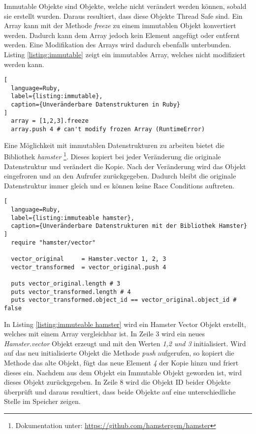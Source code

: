 Immutable Objekte sind Objekte, welche nicht verändert werden können, sobald sie erstellt wurden. Daraus resultiert, dass diese Objekte Thread Safe sind. Ein Array kann mit der Methode \emph{freeze} zu einem immutablen Objekt konvertiert werden. Dadurch kann dem Array jedoch kein Element angefügt oder entfernt werden. Eine Modifikation des Arrays wird dadurch ebenfalls unterbunden. Listing \ref{listing:immutable} zeigt ein immutables Array, welches nicht modifiziert werden kann. 

\begin{lstlisting}[
  language=Ruby,
  label={listing:immutable},
  caption={Unveränderbare Datenstrukturen in Ruby}
]
  array = [1,2,3].freeze
  array.push 4 # can't modify frozen Array (RuntimeError)
\end{lstlisting}

Eine Möglichkeit mit immutablen Datenstrukturen zu arbeiten bietet die Bibliothek \emph{hamster} \footnote{Dokumentation unter: \url{https://github.com/hamstergem/hamster}}. Dieses kopiert bei jeder Veränderung die originale Datenstruktur und verändert die Kopie. Nach der Veränderung wird das Objekt eingefroren und an den Aufrufer zurückgegeben. Dadurch bleibt die originale Datenstruktur immer gleich und es können keine Race Conditions auftreten. 

\begin{lstlisting}[
  language=Ruby,
  label={listing:immuteable hamster},
  caption={Unveränderbare Datenstrukturen mit der Bibliothek Hamster}
]
  require "hamster/vector"

  vector_original     = Hamster.vector 1, 2, 3
  vector_transformed  = vector_original.push 4

  puts vector_original.length # 3
  puts vector_transformed.length # 4
  puts vector_transformed.object_id == vector_original.object_id # false
\end{lstlisting}

In Listing \ref{listing:immuteable hamster} wird ein Hamster Vector Objekt erstellt, welches mit einem Array vergleichbar ist. In Zeile 3 wird ein neues \emph{Hamster.vector} Objekt erzeugt und mit den Werten \emph{1,2 und 3} initialisiert. Wird auf das neu initialisierte Objekt die Methode \emph{push} aufgerufen, so kopiert die Methode das alte Objekt, fügt das neue Element \emph{4} der Kopie hinzu und friert dieses ein. Nachdem aus dem Objekt ein Immutable Objekt geworden ist, wird dieses Objekt zurückgegeben. In Zeile 8 wird die Objekt ID beider Objekte überprüft und daraus resultiert, dass beide Objekte auf eine unterschiedliche Stelle im Speicher zeigen. 

